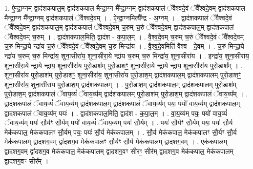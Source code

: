 \documentclass[17pt]{extarticle}
\begin{document}
1. ऐ॒न्द्रा॒ग्नम् द्वाद॑शकपाल॒म् द्वाद॑शकपाल मैन्द्रा॒ग्न मै᳚न्द्रा॒ग्नम् द्वाद॑शकपालं ॅवैश्वदे॒वं ॅवै᳚श्वदे॒वम् द्वाद॑शकपाल मैन्द्रा॒ग्न मै᳚न्द्रा॒ग्नम् द्वाद॑शकपालं ॅवैश्वदे॒वम् । . ऐ॒न्द्रा॒ग्नमित्यै᳚न्द्र - अ॒ग्नम् । . द्वाद॑शकपालं ॅवैश्वदे॒वं ॅवै᳚श्वदे॒वम् द्वाद॑शकपाल॒म् द्वाद॑शकपालं ॅवैश्वदे॒वम् च॒रुम् च॒रुं ॅवै᳚श्वदे॒वम् द्वाद॑शकपाल॒म् द्वाद॑शकपालं ॅवैश्वदे॒वम् च॒रुम् । . द्वाद॑शकपाल॒मिति॒ द्वाद॑श - क॒पा॒ल॒म् । . वै॒श्व॒दे॒वम् च॒रुम् च॒रुं ॅवै᳚श्वदे॒वं ॅवै᳚श्वदे॒वम् च॒रु मिन्द्रा॒ये न्द्रा॑य च॒रुं ॅवै᳚श्वदे॒वं ॅवै᳚श्वदे॒वम् च॒रु मिन्द्रा॑य । . वै॒श्व॒दे॒वमिति॑ वैश्व - दे॒वम् । . च॒रु मिन्द्रा॒ये न्द्रा॑य च॒रुम् च॒रु मिन्द्रा॑य॒ शुना॒सीरा॑य॒ शुना॒सीरा॒ये न्द्रा॑य च॒रुम् च॒रु मिन्द्रा॑य॒ शुना॒सीरा॑य । . इन्द्रा॑य॒ शुना॒सीरा॑य॒ शुना॒सीरा॒ये न्द्रा॒ये न्द्रा॑य॒ शुना॒सीरा॑य पुरो॒डाश॑म् पुरो॒डाशꣳ॒॒ शुना॒सीरा॒ये न्द्रा॒ये न्द्रा॑य॒ शुना॒सीरा॑य पुरो॒डाश᳚म् । . शुना॒सीरा॑य पुरो॒डाश॑म् पुरो॒डाशꣳ॒॒ शुना॒सीरा॑य॒ शुना॒सीरा॑य पुरो॒डाश॒म् द्वाद॑शकपाल॒म् द्वाद॑शकपालम् पुरो॒डाशꣳ॒॒ शुना॒सीरा॑य॒ शुना॒सीरा॑य पुरो॒डाश॒म् द्वाद॑शकपालम् । . पु॒रो॒डाश॒म् द्वाद॑शकपाल॒म् द्वाद॑शकपालम् पुरो॒डाश॑म् पुरो॒डाश॒म् द्वाद॑शकपालं ॅवाय॒व्यं॑ ॅवाय॒व्य॑म् द्वाद॑शकपालम् पुरो॒डाश॑म् पुरो॒डाश॒म् द्वाद॑शकपालं ॅवाय॒व्य᳚म् । . द्वाद॑शकपालं ॅवाय॒व्यं॑ ॅवाय॒व्य॑म् द्वाद॑शकपाल॒म् द्वाद॑शकपालं ॅवाय॒व्य॑म् पयः॒ पयो॑ वाय॒व्य॑म् द्वाद॑शकपाल॒म् द्वाद॑शकपालं ॅवाय॒व्य॑म् पयः॑ । . द्वाद॑शकपाल॒मिति॒ द्वाद॑श - क॒पा॒ल॒म् । . वा॒य॒व्य॑म् पयः॒ पयो॑ वाय॒व्यं॑ ॅवाय॒व्य॑म् पयः॑ सौ॒र्यꣳ सौ॒र्यम् पयो॑ वाय॒व्यं॑ ॅवाय॒व्य॑म् पयः॑ सौ॒र्यम् । . पयः॑ सौ॒र्यꣳ सौ॒र्यम् पयः॒ पयः॑ सौ॒र्य मेक॑कपाल॒ मेक॑कपालꣳ सौ॒र्यम् पयः॒ पयः॑ सौ॒र्य मेक॑कपालम् । . सौ॒र्य मेक॑कपाल॒ मेक॑कपालꣳ सौ॒र्यꣳ सौ॒र्य मेक॑कपालम् द्वादशग॒वम् द्वा॑दशग॒व मेक॑कपालꣳ सौ॒र्यꣳ सौ॒र्य मेक॑कपालम् द्वादशग॒वम् । . एक॑कपालम् द्वादशग॒वम् द्वा॑दशग॒व मेक॑कपाल॒ मेक॑कपालम् द्वादशग॒वꣳ सीरꣳ॒॒ सीर॑म् द्वादशग॒व मेक॑कपाल॒ मेक॑कपालम् द्वादशग॒वꣳ सीर᳚म् । \newline
\end{document}
